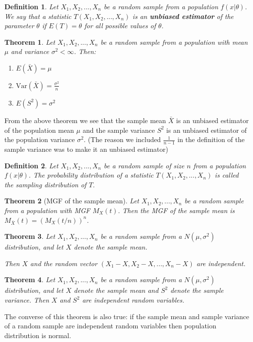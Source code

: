 \documentclass[12pt,twoside]{report}
\theoremstyle{thmstyle}
\newtheorem{defn}{Definition}
\newtheorem{thm}{Theorem}
\begin{document}
\begin{defn}
    Let $X_1, X_2, ..., X_n$ be a random sample from a population $f\left (x| \theta\right )$. We say that a statistic $T\left (X_1, X_2, ...,X_n\right )$ is an \textbf{unbiased estimator} of the parameter $\theta$ if $E(T) = \theta$ for all possible values of $\theta$.
\end{defn}

\begin{thm}
    Let $X_1, X_2, ..., X_n$ be a random sample from a population with mean $\mu $ and variance $\sigma ^2 < \infty$. Then:
    \begin{enumerate}
        \item $E\left (\bar{X}\right ) = \mu $
        \item $\text{Var}\left (\bar{X}\right ) = \frac{\sigma ^2}{n}$
        \item $E\left (S ^2\right ) = \sigma ^2$
    \end{enumerate}
\end{thm}

From the above theorem we see that the sample mean $\bar{X}$ is an unbiased estimator of the population mean $\mu$ and the sample variance $S^2$ is an unbiased estimator of the population variance $\sigma^2$. (The reason we included $\frac{1}{n-1}$ in the  definition of the sample variance was to make it an unbiased estimator)

\begin{defn}
    Let $X_1, X_2, ..., X_n$ be a random sample of size $n$ from a population $f(x|\theta)$. The probability distribution of a statistic $T(X_1, X_2, ..., X_n)$ is called the sampling distribution of $T$.
\end{defn}

\begin{thm}[MGF of the sample mean]
    Let $X_1, X_2, ..., X_n$ be a random sample from a population with MGF $M_X(t)$. Then the MGF of the sample mean is $M_{\bar{X}} (t) = (M_X (t/n))^n$.
\end{thm}

\begin{thm}
    Let $X_1, X_2, . . . , X_n$ be a random sample from a $N(\mu, \sigma^2)$ distribution, and let $X$ denote the sample mean.

    Then $X$ and the random vector $(X_1 - X, X_2 - X, . . . , X_n - X)$ are independent.
\end{thm}

\begin{thm}
    Let $X_1, X_2, . . . , X_n$ be a random sample from a $N(\mu, \sigma^2)$ distribution, 
    and let $X$ denote the sample mean and $S^2$ denote the sample variance. Then $X$ and $S^2$ are independent random variables.
\end{thm}
The converse of this theorem is also true: if the sample mean and sample variance of a random sample are independent random variables then population distribution is normal.
\end{document}
